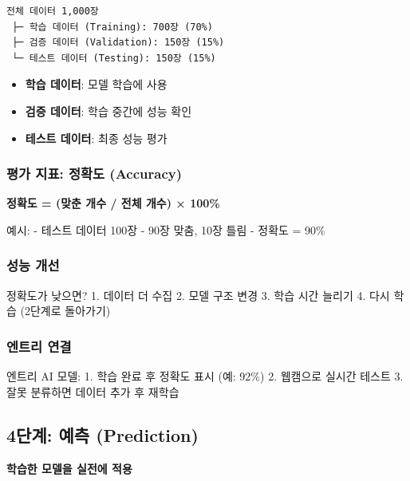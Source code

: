 \documentclass[a4paper, 11pt]{article}
\providecommand{\tightlist}{%
  \setlength{\itemsep}{0pt}\setlength{\parskip}{0pt}}
\renewenvironment{quote}
  {\begin{tcolorbox}[colback=lightblue!30, colframe=mainblue!50,
   left=8pt, right=8pt, top=4pt, bottom=4pt, breakable]}
  {\end{tcolorbox}}
\begin{document}
\begin{verbatim}
전체 데이터 1,000장
 ├─ 학습 데이터 (Training): 700장 (70%)
 ├─ 검증 데이터 (Validation): 150장 (15%)
 └─ 테스트 데이터 (Testing): 150장 (15%)
\end{verbatim}

\begin{itemize}
\tightlist
\item
  \textbf{학습 데이터}: 모델 학습에 사용
\item
  \textbf{검증 데이터}: 학습 중간에 성능 확인
\item
  \textbf{테스트 데이터}: 최종 성능 평가
\end{itemize}

\hypertarget{uxd3c9uxac00-uxc9c0uxd45c-uxc815uxd655uxb3c4-accuracy}{%
\subsubsection{평가 지표: 정확도
(Accuracy)}\label{uxd3c9uxac00-uxc9c0uxd45c-uxc815uxd655uxb3c4-accuracy}}

\textbf{정확도 = (맞춘 개수 / 전체 개수) × 100\%}

예시: - 테스트 데이터 100장 - 90장 맞춤, 10장 틀림 - 정확도 = 90\%

\hypertarget{uxc131uxb2a5-uxac1cuxc120}{%
\subsubsection{성능 개선}\label{uxc131uxb2a5-uxac1cuxc120}}

정확도가 낮으면? 1. 데이터 더 수집 2. 모델 구조 변경 3. 학습 시간 늘리기
4. 다시 학습 (2단계로 돌아가기)

\hypertarget{uxc5d4uxd2b8uxb9ac-uxc5f0uxacb0-2}{%
\subsubsection{엔트리 연결}\label{uxc5d4uxd2b8uxb9ac-uxc5f0uxacb0-2}}

엔트리 AI 모델: 1. 학습 완료 후 정확도 표시 (예: 92\%) 2. 웹캠으로
실시간 테스트 3. 잘못 분류하면 데이터 추가 후 재학습

\hypertarget{uxb2e8uxacc4-uxc608uxce21-prediction}{%
\subsection{4단계: 예측
(Prediction)}\label{uxb2e8uxacc4-uxc608uxce21-prediction}}

\begin{quote}
\textbf{학습한 모델을 실전에 적용}
\end{quote}
\end{document}
